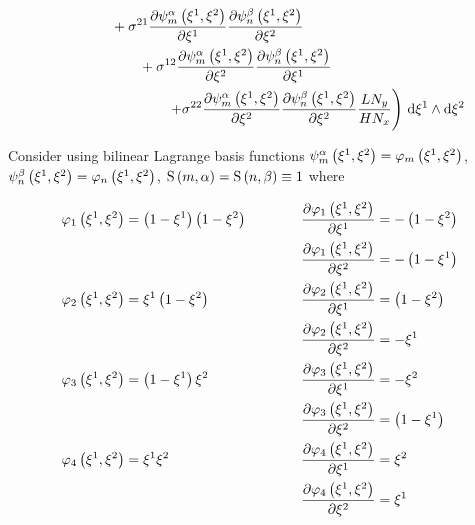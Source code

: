 \begin{equation}
\begin{aligned}
    &\qquad\qquad+\conductivitytensorsymbol^{21}\delby{\gbfn{m}{\alpha}{\xione,\xitwo}}{\xione}
    \delby{\gbfn{n}{\beta}{\xione,\xitwo}}{\xitwo}\\
    &\qquad\qquad\qquad+\conductivitytensorsymbol^{12}\delby{\gbfn{m}{\alpha}{\xione,\xitwo}}{\xitwo}
    \delby{\gbfn{n}{\beta}{\xione,\xitwo}}{\xione}\\
    &\qquad\qquad\qquad\qquad\left.+\conductivitytensorsymbol^{22}\delby{\gbfn{m}{\alpha}{\xione,\xitwo}}{\xitwo}
    \delby{\gbfn{n}{\beta}{\xione,\xitwo}}{\xitwo}\dfrac{L N_{y}}{H N_{x}}\right)\infinitesimaltwo{\xione}{\xitwo}
  \end{aligned}
\end{equation}

Consider using bilinear Lagrange basis functions \ie
$\gbfn{m}{\alpha}{\xione,\xitwo}=\lbfn{m}{\xione,\xitwo}$,
$\gbfn{n}{\beta}{\xione,\xitwo}=\lbfn{n}{\xione,\xitwo}$,
$\gsf{m}{\alpha}=\gsf{n}{\beta}\equiv 1$ where

\begin{alignat*}{3}
  \lbfn{1}{\xione,\xitwo}&=\pbrac{1-\xione}\pbrac{1-\xitwo}&\quad&&\delby{\lbfn{1}{\xione,\xitwo}}{\xione}&=-\pbrac{1-\xitwo}\\
  &&&&\delby{\lbfn{1}{\xione,\xitwo}}{\xitwo}&=-\pbrac{1-\xione} \\
  \lbfn{2}{\xione,\xitwo}&=\xione\pbrac{1-\xitwo}&\qquad&&\delby{\lbfn{2}{\xione,\xitwo}}{\xione}&=\pbrac{1-\xitwo}\\
  &&&&\delby{\lbfn{2}{\xione,\xitwo}}{\xitwo}&=-\xione\\
  \lbfn{3}{\xione,\xitwo}&=\pbrac{1-\xione}\xitwo&\qquad&&\delby{\lbfn{3}{\xione,\xitwo}}{\xione}&=-\xitwo\\
  &&&&\delby{\lbfn{3}{\xione,\xitwo}}{\xitwo}&=\pbrac{1-\xione}\\
  \lbfn{4}{\xione,\xitwo}&=\xione\xitwo&\qquad&&\delby{\lbfn{4}{\xione,\xitwo}}{\xione}&=\xitwo\\
  &&&&\delby{\lbfn{4}{\xione,\xitwo}}{\xitwo}&=\xione
\end{alignat*}

